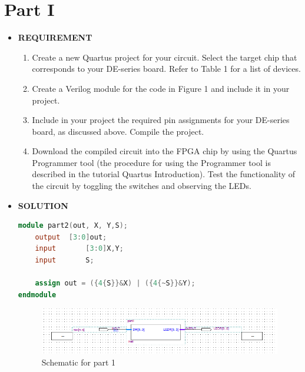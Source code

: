 \section{Part I }
\begin{itemize}
    \item [] \textbf{REQUIREMENT}
        \begin{enumerate}
            \item Create a new Quartus project for your circuit. Select the target chip that corresponds to your DE-series board. Refer to Table 1 for a list of devices.
            \item Create a Verilog module for the code in Figure 1 and include it in your project.
            \item Include in your project the required pin assignments for your DE-series board, as discussed above. Compile the project.
            \item Download the compiled circuit into the FPGA chip by using the Quartus Programmer tool (the procedure for using the Programmer tool is described in the tutorial Quartus Introduction). Test the functionality of the circuit by toggling the switches and observing the LEDs.
        \end{enumerate}
    \item [] \textbf{SOLUTION}
            \begin{lstlisting}[language=verilog]
module part2(out, X, Y,S);
    output	[3:0]out;
    input		[3:0]X,Y;
    input		S;
    
    assign out = ({4{S}}&X) | ({4{~S}}&Y);
endmodule
            \end{lstlisting}
             \begin{figure}[h]
                \centering
                \includegraphics[scale = 0.9]{source/picture/Lab1/Lab1_1.png}
                \caption{Schematic for part 1}
            \end{figure}
\end{itemize}
\clearpage
